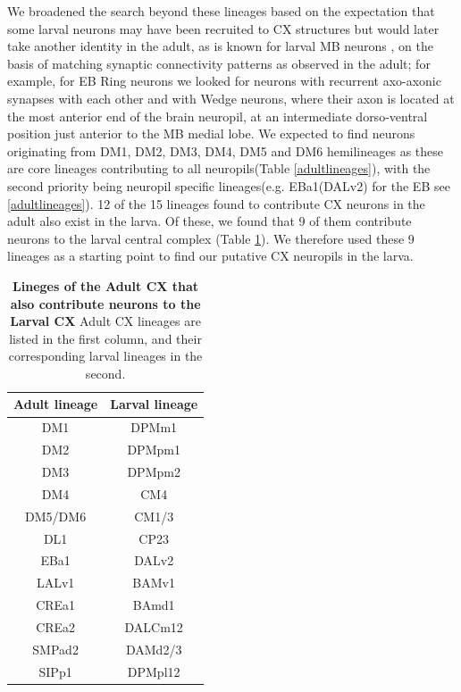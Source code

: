     We broadened the search beyond these lineages based on the expectation that some larval neurons may have been recruited to CX structures but would later take another identity in the adult, as is known for larval MB neurons \citep{truman2023metamorphosis}, on the basis of matching synaptic connectivity patterns as observed in the adult; for example, for EB Ring neurons we looked for neurons with recurrent axo-axonic synapses with each other and with Wedge neurons, where their axon is located at the most anterior end of the brain neuropil, at an intermediate dorso-ventral position just anterior to the MB medial lobe.
    We expected to find neurons originating from DM1, DM2, DM3, DM4, DM5 and DM6 hemilineages as these are core lineages contributing to all neuropils(Table \ref{adultlineages}), with the second priority being neuropil specific lineages(e.g. EBa1(DALv2) for the EB see \ref{adultlineages}). 12 of the 15 lineages found to contribute CX neurons in the adult also exist in the larva. Of these, we found that 9 of them contribute neurons to the larval central complex (Table \ref{lineagemap}). We therefore used these 9 lineages as a starting point to find our putative CX neuropils in the larva.

        \begin{table}
        \centering
        \begin{tabular}{|c|c|}
        \hline
        Adult lineage & Larval lineage \\
        \hline
        DM1 & DPMm1 \\
        DM2 & DPMpm1 \\
        DM3 & DPMpm2 \\
        DM4 & CM4 \\
        DM5/DM6 & CM1/3 \\
        DL1 & CP23 \\
        EBa1 & DALv2 \\
        LALv1 & BAMv1 \\
        CREa1 & BAmd1 \\
        CREa2 & DALCm12 \\
        SMPad2 & DAMd2/3 \\
        SIPp1 & DPMpl12 \\
        \bottomrule
        \end{tabular}
        \caption[Lineges of the Adult CX that also contribute neurons to the Larval CX]{\textbf{Lineges of the Adult CX that also contribute neurons to the Larval CX} Adult CX lineages are listed in the first column, and their corresponding larval lineages in the second.}
        \label{lineagemap}
        \end{table}

